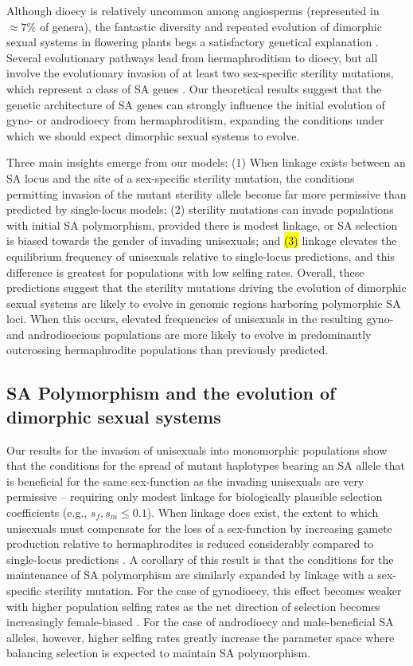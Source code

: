 \documentclass[9pt,twocolumn,twoside,lineno]{gsajnl}
\begin{document}
Although dioecy is relatively uncommon among angiosperms (represented in $\approx7\%$ of genera), the fantastic diversity and repeated evolution of dimorphic sexual systems in flowering plants begs a satisfactory genetical explanation \citep{Renner2014,KaferPannell2017}. Several evolutionary pathways lead from hermaphroditism to dioecy, but all involve the evolutionary invasion of at least two sex-specific sterility mutations, which represent a class of SA genes \citep{Charlesworth1978a,Charlesworth1978b}. Our theoretical results suggest that the genetic architecture of SA genes can strongly influence the initial evolution of gyno- or androdioecy from hermaphroditism, expanding the conditions under which we should expect dimorphic sexual systems to evolve.

Three main insights emerge from our models: (1) When linkage exists between an SA locus and the site of a sex-specific sterility mutation, the conditions permitting invasion of the mutant sterility allele become far more permissive than predicted by single-locus models; (2) sterility mutations can invade populations with initial SA polymorphism, provided there is modest linkage, or SA selection is biased towards the gender of invading unisexuals; and \hl{(3)} linkage elevates the equilibrium frequency of unisexuals relative to single-locus predictions, and this difference is greatest for populations with low selfing rates. Overall, these predictions suggest that the sterility mutations driving the evolution of dimorphic sexual systems are likely to evolve in genomic regions harboring polymorphic SA loci. When this occurs, elevated frequencies of unisexuals in the resulting gyno- and androdioecious populations are more likely to evolve in predominantly outcrossing hermaphrodite populations than previously predicted.


\subsection{SA Polymorphism and the evolution of dimorphic sexual systems}
Our results for the invasion of unisexuals into monomorphic populations show that the conditions for the spread of mutant haplotypes bearing an SA allele that is beneficial for the same sex-function as the invading unisexuals are very permissive -- requiring only modest linkage for biologically plausible selection coefficients (e.g., $s_f,s_m \leq 0.1$). When linkage does exist, the extent to which unisexuals must compensate for the loss of a sex-function by increasing gamete production relative to hermaphrodites is reduced considerably compared to single-locus predictions \citep{Charlesworth1978a}. A corollary of this result is that the conditions for the maintenance of SA polymorphism are similarly expanded by linkage with a sex-specific sterility mutation. For the case of gynodioecy, this effect becomes weaker with higher population selfing rates as the net direction of selection becomes increasingly female-biased \citep{Charlesworth1978a,JordanConnallon2014}. For the case of androdioecy and male-beneficial SA alleles, however, higher selfing rates greatly increase the parameter space where balancing selection is expected to maintain SA polymorphism. 
\end{document}
